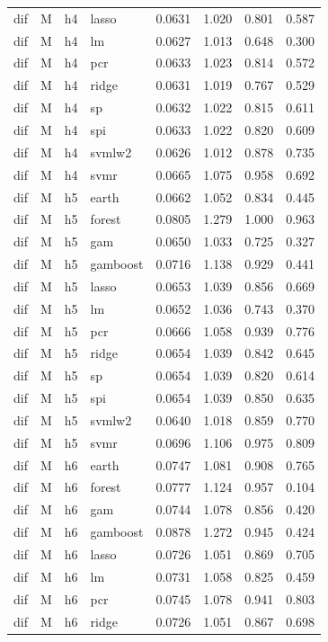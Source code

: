 \begin{ThreePartTable}
\begin{longtable}[t]{llclcccc}
dif & M & h4 & lasso & 0.0631 & 1.020 & 0.801 & 0.587\\
dif & M & h4 & lm & 0.0627 & 1.013 & 0.648 & 0.300\\
dif & M & h4 & pcr & 0.0633 & 1.023 & 0.814 & 0.572\\
dif & M & h4 & ridge & 0.0631 & 1.019 & 0.767 & 0.529\\
dif & M & h4 & sp & 0.0632 & 1.022 & 0.815 & 0.611\\
dif & M & h4 & spi & 0.0633 & 1.022 & 0.820 & 0.609\\
dif & M & h4 & svmlw2 & 0.0626 & 1.012 & 0.878 & 0.735\\
dif & M & h4 & svmr & 0.0665 & 1.075 & 0.958 & 0.692\\
\addlinespace
dif & M & h5 & earth & 0.0662 & 1.052 & 0.834 & 0.445\\
dif & M & h5 & forest & 0.0805 & 1.279 & 1.000 & 0.963\\
dif & M & h5 & gam & 0.0650 & 1.033 & 0.725 & 0.327\\
dif & M & h5 & gamboost & 0.0716 & 1.138 & 0.929 & 0.441\\
dif & M & h5 & lasso & 0.0653 & 1.039 & 0.856 & 0.669\\
dif & M & h5 & lm & 0.0652 & 1.036 & 0.743 & 0.370\\
dif & M & h5 & pcr & 0.0666 & 1.058 & 0.939 & 0.776\\
dif & M & h5 & ridge & 0.0654 & 1.039 & 0.842 & 0.645\\
dif & M & h5 & sp & 0.0654 & 1.039 & 0.820 & 0.614\\
dif & M & h5 & spi & 0.0654 & 1.039 & 0.850 & 0.635\\
dif & M & h5 & svmlw2 & 0.0640 & 1.018 & 0.859 & 0.770\\
dif & M & h5 & svmr & 0.0696 & 1.106 & 0.975 & 0.809\\
\addlinespace
dif & M & h6 & earth & 0.0747 & 1.081 & 0.908 & 0.765\\
dif & M & h6 & forest & 0.0777 & 1.124 & 0.957 & 0.104\\
dif & M & h6 & gam & 0.0744 & 1.078 & 0.856 & 0.420\\
dif & M & h6 & gamboost & 0.0878 & 1.272 & 0.945 & 0.424\\
dif & M & h6 & lasso & 0.0726 & 1.051 & 0.869 & 0.705\\
dif & M & h6 & lm & 0.0731 & 1.058 & 0.825 & 0.459\\
dif & M & h6 & pcr & 0.0745 & 1.078 & 0.941 & 0.803\\
dif & M & h6 & ridge & 0.0726 & 1.051 & 0.867 & 0.698\\

\end{longtable}
\end{ThreePartTable}

